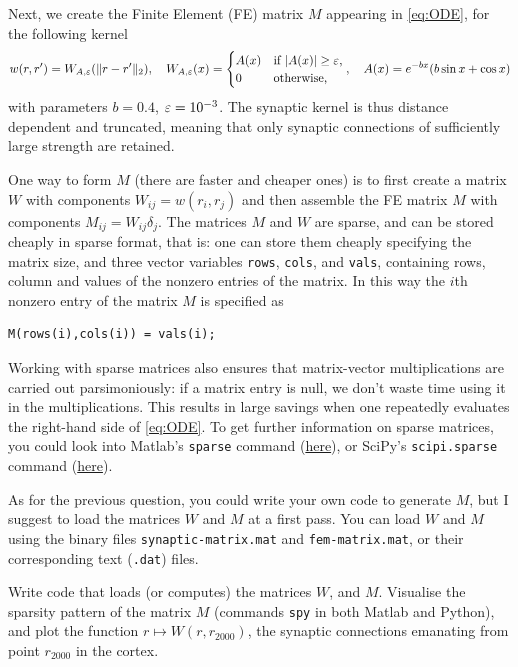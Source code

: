 \documentclass[a4paper]{siamonline220329}
\theoremstyle{plain}
\begin{document}
\begin{question}\label{question:kernels}
  Next, we create the Finite Element (FE) matrix $M$ appearing in \cref{eq:ODE}, for
  the following kernel
  \[
    w(r,r') = W_{A,\varepsilon}(\| r - r' \|_2), 
    \quad 
    W_{A,\varepsilon}(x) = 
    \begin{cases}
      A(x) & \text{if $|A(x)|  \geq \varepsilon $,} \\
      0    & \text{otherwise,} 
    \end{cases},
    \quad 
    A(x) = e^{-bx}(b \sin x + \cos x )
  \]
  with parameters $b =0.4$, $\varepsilon = 10^{-3}$.
  The synaptic kernel is thus distance dependent and truncated, meaning that only
  synaptic connections of sufficiently large strength are retained.

  One way to form $M$ (there are faster and cheaper ones) is to first create a matrix
  $W$ with components $W_{ij} =  w(r_i,r_j)$ and then assemble the FE matrix $M$ with
  components $M_{ij}=W_{ij}
  \delta_j$. The matrices $M$ and $W$ are sparse, and can be stored cheaply in sparse
  format, that is: one can store them cheaply specifying the matrix size, and three
  vector variables \lstinline|rows|, \lstinline|cols|, and \lstinline|vals|,
  containing rows, column and values of the nonzero entries of the matrix. In this
  way the $i$th nonzero entry of the
  matrix $M$ is specified as
      \begin{lstlisting}[numbers=none]
M(rows(i),cols(i)) = vals(i);
      \end{lstlisting}
  Working with sparse matrices also ensures that matrix-vector multiplications are
  carried out parsimoniously: if a matrix entry is null, we don't waste time using it
  in the multiplications. This results in large savings when one repeatedly evaluates
  the right-hand side of \cref{eq:ODE}. To get further information on sparse matrices,
  you could look into Matlab's  \lstinline|sparse| command
  (\href{https://nl.mathworks.com/help/matlab/ref/sparse.html}{here}), or SciPy's
  \lstinline|scipi.sparse|
  command (\href{https://docs.scipy.org/doc/scipy/reference/sparse.html}{here}).

  As for the previous question, you could write your own code to generate $M$, but I
  suggest to load the matrices $W$ and $M$ at a first pass. You can load
  $W$ and $M$ using the binary files \lstinline|synaptic-matrix.mat| and
  \lstinline|fem-matrix.mat|, or their corresponding text (\lstinline|.dat|) files.

  Write code that loads (or computes) the matrices $W$, and $M$. Visualise the
  sparsity pattern of the matrix $M$ (commands \lstinline|spy| in both Matlab and
  Python), and plot the function $r \mapsto W(r,r_{2000})$, the synaptic connections
  emanating from point $r_{2000}$ in the cortex.
\end{question}
\end{document}
